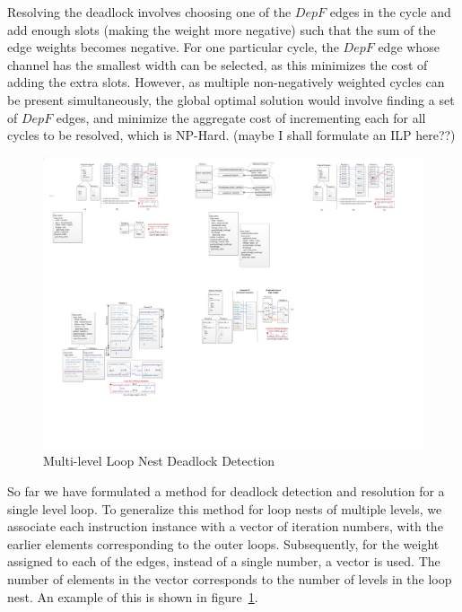 Resolving
the deadlock involves choosing one of the $DepF$ edges
in the cycle and add enough slots (making the weight more negative)
such that the sum of the edge weights becomes negative. For
one particular cycle, the $DepF$ edge whose channel has the smallest width can be selected, as this minimizes the cost of adding the extra slots. However,
as multiple non-negatively weighted cycles can be present simultaneously,
the global optimal solution would involve finding a set of $DepF$ edges, 
and minimize the aggregate cost of incrementing each for all cycles to be resolved, which 
is NP-Hard. (maybe I shall formulate an ILP here??)
\begin{figure}[htp]
\begin{center}
\includegraphics[width=1.0\linewidth]{chap4fig/vectorAnnot.pdf}
\caption{Multi-level Loop Nest Deadlock Detection
\label{fig:vectorannot}}
\end{center}
\end{figure}

So far we have formulated a method for deadlock detection and resolution
for a single level loop. To generalize this method for loop nests of multiple
levels, we associate each instruction instance with
a vector of iteration numbers, with the earlier elements corresponding to the outer loops.
Subsequently, for the weight assigned to each of the edges, instead of
a single number, a vector is used. The number of elements in the vector
corresponds to the number of levels in the loop nest.
An example of this is shown in figure~\ref{fig:vectorannot}. 



